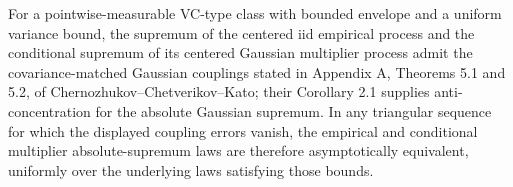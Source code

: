 For a pointwise-measurable VC-type class with bounded envelope and a uniform variance bound, the supremum of the centered iid empirical process and the conditional supremum of its centered Gaussian multiplier process admit the covariance-matched Gaussian couplings stated in Appendix A, Theorems 5.1 and 5.2, of Chernozhukov--Chetverikov--Kato; their Corollary 2.1 supplies anti-concentration for the absolute Gaussian supremum.  In any triangular sequence for which the displayed coupling errors vanish, the empirical and conditional multiplier absolute-supremum laws are therefore asymptotically equivalent, uniformly over the underlying laws satisfying those bounds.